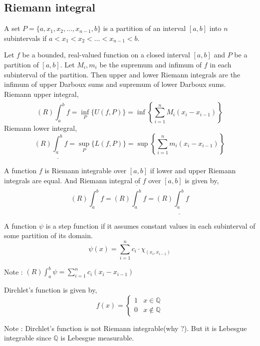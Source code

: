 \subsection{Riemann integral}
\begin{definition}[partition]
	A set $P = \{a,x_1,x_2,\dots,x_{n-1},b \}$ is a partition of an interval $[a,b]$ into $n$ subintervals if $a < x_1 < x_2 < \dots < x_{n-1} < b$.
\end{definition}
\begin{definition}
	Let $f$ be a bounded, real-valued function on a closed interval $[a,b]$ and $P$ be a partition of $[a,b]$.
	Let $M_i,m_i$ be the supremum and infimum of $f$ in each subinterval of the partition.
	Then upper and lower Riemann integrals are the infimum of upper Darboux sums and supremum of lower Darboux sums.\\

	Riemann upper integral, 
	\begin{equation}
	 (R)\overline{\int_a^b} f = \inf_P \{ U(f,P) \} = \inf \left\{ \sum_{i=1}^n M_i (x_i - x_{i-1}) \right\} 
	\end{equation}
	Riemann lower integral, 
	\begin{equation}
	 (R)\underline{\int_a^b} f = \sup_P \{ L(f,P) \} = \sup \left\{ \sum_{i=1}^n m_i (x_i - x_{i-1}) \right\} 
	\end{equation}
\end{definition}
\begin{definition}
	A function $f$ is Riemann integrable over $[a,b]$ if lower and upper Riemann integrals are equal.
	And Riemann integral of $f$ over $[a,b]$ is given by,
	\begin{equation}
		(R)\int_a^b f = (R)\overline{\int_a^b} f = (R) \underline{\int_a^b} f 
	\end{equation}
\end{definition}

\begin{definition}
	A function $\psi$ is a step function if it assumes constant values in each subinterval of some partition of its domain.
	\[ \psi(x) = \sum_{i = 1}^n c_i \cdot \chi_{(x_i,x_{i-1})} \]
\end{definition}
Note : $\displaystyle (R)\int_a^b \psi = \sum_{i=1}^n c_i (x_i-x_{i-1})$
\begin{definition}
	Dirchlet's function is given by,
	\[ f(x) = \begin{cases} 1 & x \in \mathbb{Q} \\ 0 & x \notin \mathbb{Q} \end{cases} \]
\end{definition}
Note : Dirchlet's function is not Riemann integrable(why ?). But it is Lebesgue integrable since $\mathbb{Q}$ is Lebesgue measurable.

